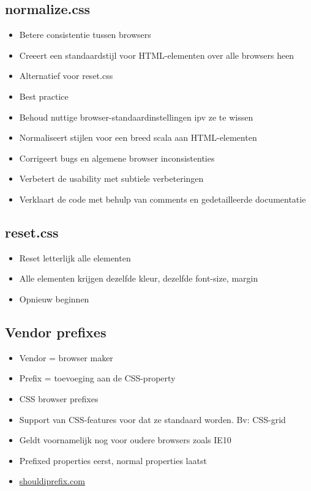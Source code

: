 \documentclass{article}
\begin{document}
\subsection{normalize.css}
\begin{itemize}
    \item Betere consistentie tussen browsers
    \item Creeert een standaardstijl voor HTML-elementen over alle browsers heen
    \item Alternatief voor reset.css
    \item Best practice
    \item Behoud nuttige browser-standaardinstellingen ipv ze te wissen
    \item Normaliseert stijlen voor een breed scala aan HTML-elementen
    \item Corrigeert bugs en algemene browser inconsistenties
    \item Verbetert de usability met subtiele verbeteringen
    \item Verklaart de code met behulp van comments en gedetailleerde documentatie
\end{itemize}

\subsection{reset.css}
\begin{itemize}
    \item Reset letterlijk alle elementen
    \item Alle elementen krijgen dezelfde kleur, dezelfde font-size, margin
    \item Opnieuw beginnen
\end{itemize}

\subsection{Vendor prefixes}
\begin{itemize}
    \item Vendor = browser maker
    \item Prefix = toevoeging aan de CSS-property
    \item CSS browser prefixes
    \item Support van CSS-features voor dat ze standaard worden. Bv: CSS-grid
    \item Geldt voornamelijk nog voor oudere browsers zoals IE10
    \item Prefixed properties eerst, normal properties laatst
    \item \url{shouldiprefix.com}
\end{itemize}
\end{document}
